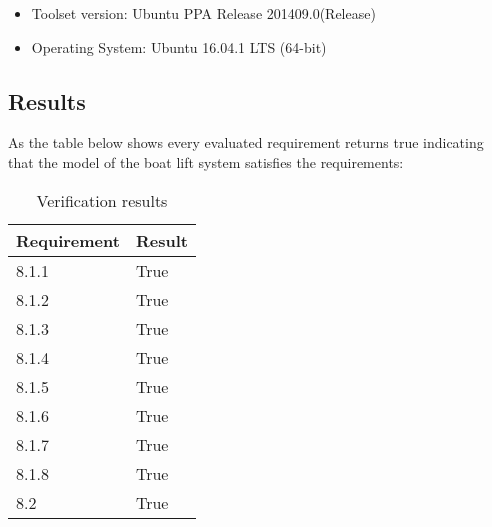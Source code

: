 \begin{itemize}
	\item Toolset version: Ubuntu PPA Release 201409.0(Release)
	\item Operating System: Ubuntu 16.04.1 LTS (64-bit)

\end{itemize}
\pagebreak
\subsection{Results}
As the table below shows every evaluated requirement returns true indicating that the model of the boat lift system satisfies the requirements:

\begin{table}[htbp]
	\centering
	\begin{tabular}{ll}
		\toprule
		\textbf{Requirement} &  \textbf{Result} \\
		\hline
		8.1.1&  True \\
		8.1.2&  True \\
		8.1.3&  True \\
		8.1.4&  True \\
		8.1.5&  True \\
		8.1.6&  True \\
		8.1.7&  True \\
		8.1.8&  True \\
		8.2& True\\
		\bottomrule
	\end{tabular}%
	\caption{Verification results}
	\label{tab:sort}%
\end{table}%
